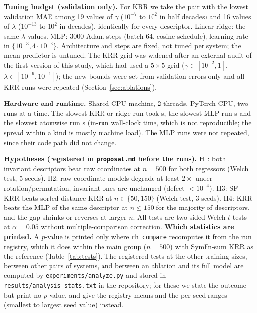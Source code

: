 \textbf{Tuning budget (validation only).} For KRR we take the pair with the lowest validation MAE among 19 values of $\gamma$ ($10^{-7}$ to $10^{2}$ in half decades) and 16 values of $\lambda$ ($10^{-13}$ to $10^{2}$ in decades), identically for every descriptor. Linear ridge: the same $\lambda$ values. MLP: 3000 Adam steps (batch 64, cosine schedule), learning rate in $\{10^{-3},4\cdot10^{-3}\}$. Architecture and steps are fixed, not tuned per system; the mean predictor is untuned. The KRR grid was widened after an external audit of the first version of this study, which had used a $5\times5$ grid ($\gamma\in[10^{-2},1]$, $\lambda\in[10^{-9},10^{-1}]$); the new bounds were set from validation errors only and all KRR runs were repeated (Section~\ref{sec:ablations}).

\textbf{Hardware and runtime.} Shared CPU machine, 2 threads, PyTorch CPU, two runs at a time. The slowest KRR or ridge run took  s, the slowest MLP run  s and the slowest atomwise run  s (in-run wall-clock time, which is not reproducible; the spread within a kind is mostly machine load). The MLP runs were not repeated, since their code path did not change.

\textbf{Hypotheses (registered in \texttt{proposal.md} before the runs).} H1: both invariant descriptors beat raw coordinates at $n{=}500$ for both regressors (Welch test, 5 seeds). H2: raw-coordinate models degrade at least $2\times$ under rotation/permutation, invariant ones are unchanged (defect $<10^{-4}$). H3: SF-KRR beats sorted-distance KRR at $n\in\{50,150\}$ (Welch test, 3 seeds). H4: KRR beats the MLP of the same descriptor at $n\le150$ for the majority of descriptors, and the gap shrinks or reverses at larger $n$. All tests are two-sided Welch $t$-tests at $\alpha=0.05$ without multiple-comparison correction. \textbf{Which statistics are printed.} A $p$-value is printed only where \texttt{rh compare} recomputes it from the run registry, which it does within the main group ($n{=}500$) with SymFn-sum KRR as the reference (Table~\ref{tab:tests}). The registered tests at the other training sizes, between other pairs of systems, and between an ablation and its full model are computed by \texttt{experiments/analyze.py} and stored in \texttt{results/analysis\_stats.txt} in the repository; for these we state the outcome but print no $p$-value, and give the registry means and the per-seed ranges (smallest to largest seed value) instead.
